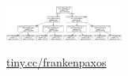 
\begin{tikzfigure}
\includegraphics[width=0.29\textwidth]{figures/frankenpaxos_decision_tree.png}
\end{tikzfigure}

\begin{center}
  \huge
  \url{tiny.cc/frankenpaxos}
\end{center}
